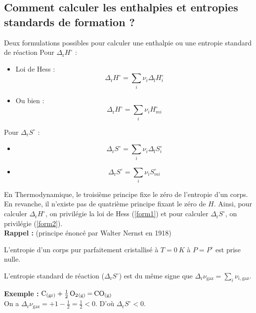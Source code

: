 \documentclass{article}
\let\oldref\ref
\renewcommand{\ref}[1]{(\oldref{#1})}
\newcommand{\Dr}{\Delta_{\mathrm{r}}}
\newcommand{\Df}{\Delta_{\mathrm{f}}}
\begin{document}
\subsection{Comment calculer les enthalpies et entropies standards de formation ?}
\begin{tableau}
    Deux formulations possibles pour calculer une enthalpie ou une entropie standard de réaction
    \tcbline
    Pour $\Dr H^\circ$ :
    \begin{itemize}
        \item Loi de Hess :
        \begin{equation}\label{form1}
            \Dr H^\circ = \sum_i\nu_i \Df H_i^\circ
        \end{equation}
        \item Ou bien :
        \begin{equation*}
            \Dr H^\circ = \sum_i\nu_i H_{mi}^\circ
        \end{equation*}
    \end{itemize}
    Pour $\Dr S^\circ$ :
    \begin{itemize}
        \item
        \begin{equation*}
            \Dr S^\circ = \sum_i\nu_i \Df S_i^\circ
        \end{equation*}
        \item
        \begin{equation}\label{form2}
            \Dr S^\circ = \sum_i\nu_i S_{mi}^\circ
        \end{equation}
    \end{itemize}
    
    En Thermodynamique, le troisième principe fixe le zéro de l'entropie d'un corps. En revanche, il n'existe pas de quatrième principe fixant le zéro de $H$. Ainsi, pour calculer $\Dr H^\circ$, on privilégie la loi de Hess \ref{form1} et pour calculer $\Dr S^\circ$, on privilégie \ref{form2}.\\
    
    \textbf{Rappel :} (principe énoncé par Walter Nernst en 1918)
    \begin{enonce}
    L'entropie d'un corps pur parfaitement cristallisé à $T=\SI{0}{K}$ à $P= P^\circ$ est prise nulle.
    \end{enonce}
    
    \begin{remarque}[Remarque]
         L'entropie standard de réaction ($\Dr S^\circ$) est du même signe que $\Dr \nu_\mathrm{gaz} = \sum_i \nu_{i,\mathrm{gaz}}$.
    \end{remarque}
    
    \textbf{Exemple :} $\ce{C_{(gr)} + 1/2O2_{(g)} = CO_{(g)}}$\\
    On a $\Dr \nu_\mathrm{gaz} = +1-\frac{1}{2} = \frac{1}{2}<0$. D'où $\Dr S^\circ<0$.
\end{tableau}
\end{document}
